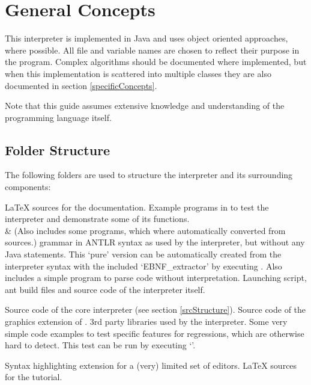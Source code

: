 \section{General Concepts}

This interpreter is implemented in Java and uses object oriented approaches, where possible. All file and variable names are chosen to reflect their purpose in the program. Complex algorithms should be documented where implemented, but when this implementation is scattered into multiple classes they are also documented in section \ref{specificConcepts}.

Note that this guide assumes extensive knowledge and understanding of the \SetlX{} programming language itself.

\subsection{Folder Structure}

The following folders are used to structure the interpreter and its surrounding components:

\begin{itemize}
            {\LaTeX{} sources for the documentation.}
            {Example programs in \SetlX{} to test the interpreter and demonstrate some of its functions.\\&
             (Also includes some programs, which where automatically converted from \SetlTwo{} sources.)}
            {\SetlX{} grammar in ANTLR syntax as used by the interpreter, but without any Java statements. This `pure' version can be automatically created from the interpreter syntax with the included `EBNF\_extractor' by executing . Also includes a simple program to parse \SetlX{} code without interpretation.}
            {Launching script, ant build files and source code of the interpreter itself.}
    \begin{itemize}
                {Source code of the core interpreter (see section \ref{srcStructure}).}
                {Source code of the graphics extension of \setlX.}
                {3rd party libraries used by the interpreter.}
                {Some very simple \SetlX{} code examples to test specific features for regressions, which are otherwise hard to detect. This test can be run by executing `'.}
    \end{itemize}
            {Syntax highlighting extension for a (very) limited set of editors.}
            {\LaTeX{} sources for the tutorial.}
\end{itemize}

